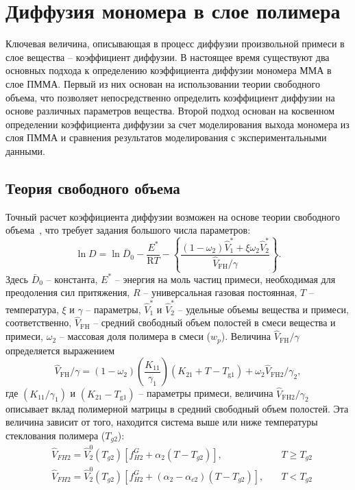 \section{Диффузия мономера в слое полимера}
Ключевая величина, описывающая в процесс диффузии произвольной примеси в слое вещества -- коэффициент диффузии. В настоящее время существуют два основных подхода к определению коэффициента диффузии мономера ММА в слое ПММА. Первый из них основан на использовании теории свободного объема, что позволяет непосредственно определить коэффициент диффузии на основе различных параметров вещества. Второй подход основан на косвенном определении коэффициента диффузии за счет моделирования выхода мономера из слоя ПММА и сравнения результатов моделирования с экспериментальными данными.

\subsection{Теория свободного объема}
Точный расчет коэффициента диффузии возможен на основе теории свободного объема~\cite{Vrentas_free_volume, Zielinski_free_volume}, что требует задания большого числа параметров:
\begin{equation}
	\ln D=\ln \bar{D}_0-\frac{E^*}{\mathrm{R} T}-\left\{\frac{\left(1-\omega_2\right) \hat{V}_1^*+\xi \omega_2 \hat{V}_2^*}{\hat{V}_{\mathrm{FH}} / \gamma}\right\}.
\end{equation}
Здесь $\bar{D}_0$ -- константа, $E^*$ -- энергия на моль частиц примеси, необходимая для преодоления сил притяжения, $R$ -- универсальная газовая постоянная, $T$ -- температура, $\xi$ и $\gamma$ -- параметры, $\hat{V}_1^*$ и $\hat{V}_2^*$ -- удельные объемы вещества и примеси, соответственно, $\hat{V}_{\mathrm{FH}}$ -- средний свободный объем полостей в смеси вещества и примеси, $\omega_2$ -- массовая доля полимера в смеси ($w_p$). Величина $\hat{V}_{\mathrm{FH}} / \gamma$ определяется выражением
\begin{equation}
	\hat{V}_{\mathrm{FH}} / \gamma=\left(1-\omega_2\right)\left(\frac{K_{11}}{\gamma_1}\right)\left(K_{21}+T-T_{\mathrm{g} 1}\right)+\omega_2 \hat{V}_{\mathrm{FH} 2} / \gamma_2,
\end{equation}
где $\left(K_{11} / \gamma_1\right)$ и $\left(K_{21}-T_{\mathrm{g} 1}\right)$ -- параметры примеси, величина $\hat{V}_{\mathrm{FH} 2} / \gamma_2$ описывает вклад полимерной матрицы в средний свободный объем полостей. Эта величина зависит от того, находится система выше или ниже температуры стеклования полимера ($T_{g2}$):
\begin{equation}
	\begin{aligned}
		&\hat{V}_{FH2} =
		\hat{V}_2^0 (T_{g2}) \left[ f_{H2}^{G}+\alpha_2 (T-T_{g2}) \right], & T \geq T_{g2} \\
		&\hat{V}_{FH2} =
		\hat{V}_2^0 (T_{g2})\left[f_{H2}^{G}+(\alpha_2-\alpha_{c2})(T-T_{g2})\right], \hspace{1em} & T<T_{g2}
	\end{aligned}
\end{equation}
